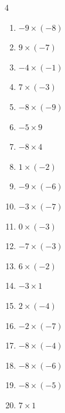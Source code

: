 \begin{multicols}{4}
\begin{enumerate}
  \item $-9\times (-8)$
        \phantom{$=72$}

  \item $9\times (-7)$
        \phantom{$=-63$}

  \item $-4\times (-1)$
        \phantom{$=4$}

\columnbreak %

\resetques

  \item $7\times (-3)$
        \phantom{$=-21$}

  \item $-8\times (-9)$
        \phantom{$=72$}

  \item $-5\times 9$
        \phantom{$=-45$}

  \item $-8\times 4$
        \phantom{$=-32$}

  \item $1\times (-2)$
        \phantom{$=-2$}

  \item $-9\times (-6)$
        \phantom{$=54$}

  \item $-3\times (-7)$
        \phantom{$=21$}

  \item $0\times (-3)$
        \phantom{$=0$}

  \item $-7\times (-3)$
        \phantom{$=21$}

  \item $6\times (-2)$
        \phantom{$=-12$}

  \item $-3\times 1$
        \phantom{$=-3$}

  \item $2\times (-4)$
        \phantom{$=-8$}

  \item $-2\times (-7)$
        \phantom{$=14$}

  \item $-8\times (-4)$
        \phantom{$=32$}

  \item $-8\times (-6)$
        \phantom{$=48$}

  \item $-8\times (-5)$
        \phantom{$=40$}

  \item $7\times 1$
        \phantom{$=7$}


\end{enumerate}
\end{multicols}
